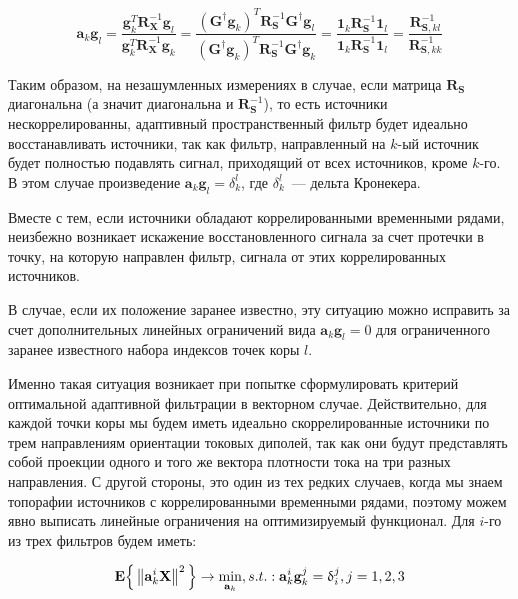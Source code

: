 \begin{equation}
    \mathbf{a}_k \mathbf{g}_l = \frac{\mathbf{g}_k^T \mathbf{R}_\mathbf{X}^{-1}\mathbf{g}_l}
                                   {\mathbf{g}_k^T \mathbf{R}_\mathbf{X}^{-1} \mathbf{g}_k}=
  \frac{{(\mathbf{G}^\dagger\mathbf{g}_k)}^T \mathbf{R}_\mathbf{S}^{-1} \mathbf{G}^\dagger \mathbf{g}_l}
       {{(\mathbf{G}^\dagger\mathbf{g}_k)}^T \mathbf{R}_\mathbf{S}^{-1} \mathbf{G}^\dagger \mathbf{g}_k}=
       \frac{\mathbf{1}_k \mathbf{R}_\mathbf{S}^{-1} \mathbf{1}_l}
            {\mathbf{1}_k \mathbf{R}_\mathbf{S}^{-1} \mathbf{1}_l} =
            \frac{\mathbf{R}_{\mathbf{S}, kl}^{-1}}
                 {\mathbf{R}_{\mathbf{S}, kk}^{-1}}
\end{equation}

Таким образом, на незашумленных измерениях в случае, если матрица
$\mathbf{R}_\mathbf{S}$ диагональна (а значит диагональна и
$\mathbf{R}_\mathbf{S}^{-1}$), то есть источники нескоррелированны, адаптивный
пространственный фильтр будет идеально восстанавливать источники, так как
фильтр, направленный на $k$-ый источник будет полностью подавлять сигнал,
приходящий от всех источников, кроме $k$-го.  В этом случае произведение
$\mathbf{a}_k \mathbf{g}_l = \delta_k^l$, где $\delta_k^l$~--- дельта
Кронекера.

Вместе с тем, если источники обладают коррелированными временными рядами,
неизбежно возникает искажение восстановленного сигнала за счет протечки в
точку, на которую направлен фильтр, сигнала от этих коррелированных источников.

В случае, если их положение заранее известно, эту ситуацию можно исправить за
счет дополнительных линейных ограничений вида $\mathbf{a}_k \mathbf{g}_l=0$ для
ограниченного заранее известного набора индексов точек коры $l$.

Именно такая ситуация возникает при попытке сформулировать критерий оптимальной
адаптивной фильтрации в векторном случае. Действительно, для каждой точки коры
мы будем иметь идеально скоррелированные источники по трем направлениям
ориентации токовых диполей, так как они будут представлять собой проекции
одного и того же вектора плотности тока на три разных направления. С другой
стороны, это один из тех редких случаев, когда мы знаем топорафии источников с
коррелированными временными рядами, поэтому можем явно выписать линейные
ограничения на оптимизируемый функционал. Для $i$-го из трех фильтров будем
иметь:

\begin{equation}
    \mathbf{E}\Big\{\left\lVert\mathbf{a}_k^i \mathbf{X}\right\rVert^2\Big\}
    \rightarrow \underset{\mathbf{a}_k}{\min},
    s.t.: \mathbf{a}_k^i \mathbf{g}_k^j =  \updelta_i^j, j = 1,2,3
    \label{lcmv_opt_crit_components}
\end{equation}

